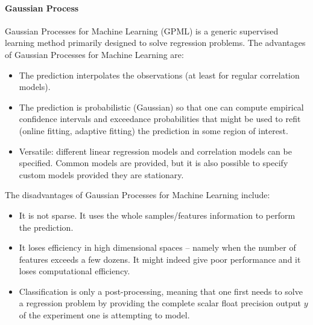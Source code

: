 \paragraph{Gaussian Process}
\label{GP}
Gaussian Processes for Machine Learning (GPML) is a generic supervised learning
method primarily designed to solve regression problems.
%
The advantages of Gaussian Processes for Machine Learning are:
\begin{itemize}
  \item The prediction interpolates the observations (at least for regular
  correlation models).
  \item The prediction is probabilistic (Gaussian) so that one can compute
  empirical confidence intervals and exceedance probabilities that might be used
  to refit (online fitting, adaptive fitting) the prediction in some region of
  interest.
  \item Versatile: different linear regression models and correlation models can
  be specified.
  Common models are provided, but it is also possible to specify custom models
  provided they are stationary.
\end{itemize}
The disadvantages of Gaussian Processes for Machine Learning include:
\begin{itemize}
  \item It is not sparse.
  It uses the whole samples/features information to perform the prediction.
  \item It loses efficiency in high dimensional spaces – namely when the
  number of features exceeds a few dozens.
  It might indeed give poor performance and it loses computational efficiency.
  \item Classification is only a post-processing, meaning that one first needs
  to solve a regression problem by providing the complete scalar float precision
  output $y$ of the experiment one is attempting to model.
\end{itemize}



